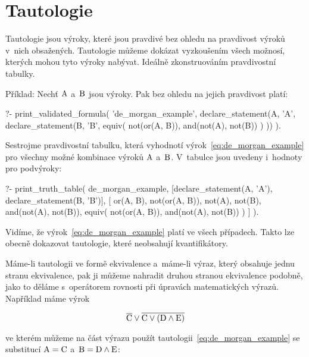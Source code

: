 \section{Tautologie}

Tautologie jsou výroky, které jsou pravdivé bez ohledu na pravdivost výroků v~nich obsažených. Tautologie můžeme dokázat vyzkoušením všech možnosí, kterých mohou tyto výroky nabývat. Ideálně zkonstruováním pravdivostní tabulky.

Příklad: Nechť \(\mathrm{A}\) a~\(\mathrm{B}\) jsou výroky. Pak bez ohledu na jejich pravdivost platí:

\begin{prolog}
?- print_validated_formula(
	'de_morgan_example',
	declare_statement(A, 'A', declare_statement(B, 'B',
		equiv(
			not(or(A, B)),
			and(not(A), not(B))
		)
	))
).
\end{prolog}

Sestrojme pravdivostní tabulku, která vyhodnotí výrok~\eqref{eq:de_morgan_example} pro všechny možné kombinace výroků \(\mathrm{A}\) a~\(\mathrm{B}\). V~tabulce jsou uvedeny i~hodnoty pro podvýroky:

\begin{prolog}
?- print_truth_table(
	de_morgan_example,
	[declare_statement(A, 'A'), declare_statement(B, 'B')],
	[
		or(A, B),
		not(or(A, B)),
		not(A),
		not(B),
		and(not(A), not(B)),
		equiv(
			not(or(A, B)),
			and(not(A), not(B))
		)
	]
).
\end{prolog}

Vidíme, že výrok~\eqref{eq:de_morgan_example} platí ve všech případech. Takto lze obecně dokazovat tautologie, které neobsahují kvantifikátory.

Máme-li tautologii ve formě ekvivalence a~máme-li výraz, který obsahuje jednu stranu ekvivalence, pak ji můžeme nahradit druhou stranou ekvivalence podobně, jako to děláme s~operátorem rovnosti při úpravách matematických výrazů. Například máme výrok

\begin{equation}
\overline{\mathrm{C}} \lor \overline{\mathrm{C} \lor (\mathrm{D} \land \mathrm{E})}
\end{equation}

ve kterém můžeme na část výrazu použít tautologii~\eqref{eq:de_morgan_example} se substitucí \(\mathrm{A} = \mathrm{C}\) a~\(\mathrm{B} = \mathrm{D} \land \mathrm{E}\):

